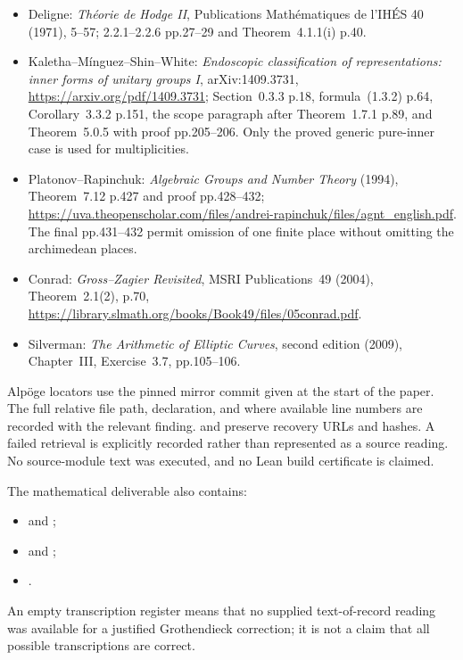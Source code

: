 \begin{itemize}[leftmargin=*]
{and automorphic vector bundles}, corrected 2018 version of the
1990 work, \url{https://jmilne.org/math/xnotes/AA.pdf};
Chapter III, Remark~2.3 and Example~2.4 pp.55--56,
Theorem~5.1 and Remark~5.2 p.61, Sections~6--7 pp.61--63.
\item Deligne: \emph{Th\'eorie de Hodge II}, Publications
Math\'ematiques de l'IH\'ES 40 (1971), 5--57;
2.2.1--2.2.6 pp.27--29 and Theorem~4.1.1(i) p.40.
\item Kaletha--M\'inguez--Shin--White:
\emph{Endoscopic classification of representations: inner forms
of unitary groups I}, arXiv:1409.3731,
\url{https://arxiv.org/pdf/1409.3731};
Section~0.3.3 p.18, formula~(1.3.2) p.64,
Corollary~3.3.2 p.151, the scope paragraph after
Theorem~1.7.1 p.89, and Theorem~5.0.5 with proof
pp.205--206. Only the proved generic pure-inner case
is used for multiplicities.
\item Platonov--Rapinchuk: \emph{Algebraic Groups and Number
Theory} (1994), Theorem~7.12 p.427 and proof pp.428--432;
\url{https://uva.theopenscholar.com/files/andrei-rapinchuk/files/agnt_english.pdf}.
The final pp.431--432 permit omission of one finite
place without omitting the archimedean places.
\item Conrad: \emph{Gross--Zagier Revisited}, MSRI
Publications~49 (2004), Theorem~2.1(2), p.70,
\url{https://library.slmath.org/books/Book49/files/05conrad.pdf}.
\item Silverman: \emph{The Arithmetic of Elliptic Curves},
second edition (2009), Chapter~III, Exercise~3.7,
pp.105--106.
\end{itemize}

Alp\"oge locators use the pinned mirror commit given at the start
of the paper. The full relative file path, declaration, and where
available line numbers are recorded with the relevant finding.
 and
 preserve recovery
URLs and hashes. A failed retrieval is explicitly recorded rather
than represented as a source reading. No source-module text was
executed, and no Lean build certificate is claimed.

The mathematical deliverable also contains:
\begin{itemize}[leftmargin=*]
\item {} and ;
\item {} and ;
\item {}.
\end{itemize}
An empty transcription register means that no
supplied text-of-record reading was available for a justified
Grothendieck correction; it is not a claim that all possible
transcriptions are correct.
